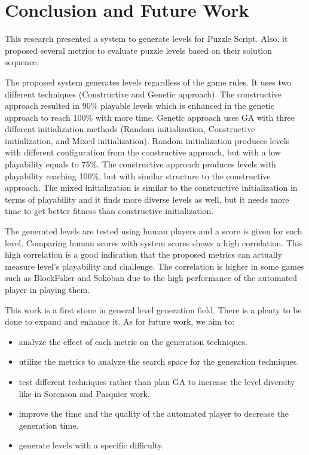 \documentclass[letterpaper]{article}
\begin{document}
\section{Conclusion and Future Work}
This research presented a system to generate levels for Puzzle Script. Also, it proposed several metrics to evaluate puzzle levels based on their solution sequence.\\\par

The proposed system generates levels regardless of the game rules. It uses two different techniques (Constructive and Genetic approach). The constructive approach resulted in 90\% playable levels which is enhanced in the genetic approach to reach 100\% with more time. Genetic approach uses GA with three different initialization methods (Random initialization, Constructive initialization, and Mixed initialization). Random initialization produces levels with different configuration from the constructive approach, but with a low playability equals to 75\%.  The constructive approach produces levels with playability reaching 100\%, but with similar structure to the constructive approach. The mixed initialization is similar to the constructive initialization in terms of playability and it finds more diverse levels as well, but it needs more time to get better fitness than constructive initialization.\\\par

The generated levels are tested using human players and a score is given for each level. Comparing human scores with system scores shows a high correlation. This high correlation is a good indication that the proposed metrics can actually measure level's playability and challenge. The correlation is higher in some games such as BlockFaker and Sokoban due to the high performance of the automated player in playing them.\\\par

This work is a first stone in general level generation field. There is a plenty to be done to expand and enhance it. As for future work, we aim to:
\begin{itemize}
	\item analyze the effect of each metric on the generation techniques.
	\item utilize the metrics to analyze the search space for the generation techniques.
	\item test different techniques rather than plan GA to increase the level diversity like in Sorenson and Pasquier work\cite{genericLevelFramework}.
	\item improve the time and the quality of the automated player to decrease the generation time.
	\item generate levels with a specific difficulty.
\end{itemize}
\end{document}
